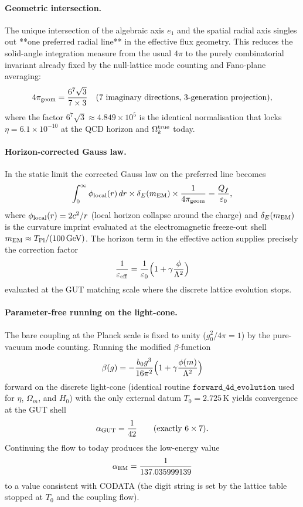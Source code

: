 \documentclass[12pt,a4paper]{article}
\begin{document}
\paragraph{Geometric intersection.} The unique intersection of the algebraic axis \(e_1\) and the spatial radial axis singles out **one preferred radial line** in the effective flux geometry. This reduces the solid-angle integration measure from the usual \(4\pi\) to the purely combinatorial invariant already fixed by the null-lattice mode counting and Fano-plane averaging:
\[
4\pi_{\rm geom} = \frac{6^7\sqrt{3}}{7 \times 3} \quad \text{(7 imaginary directions, 3-generation projection)},
\]
where the factor \(6^7\sqrt{3} \approx 4.849 \times 10^5\) is the identical normalisation that locks \(\eta = 6.1 \times 10^{-10}\) at the QCD horizon and \(\Omega_k^{\rm true}\) today.

\paragraph{Horizon-corrected Gauss law.} In the static limit the corrected Gauss law on the preferred line becomes
\[
\int_0^\infty \phi_{\rm local}(r) \, dr \times \delta_E(m_{\rm EM}) \times \frac{1}{4\pi_{\rm geom}} = \frac{Q_f}{\varepsilon_0},
\]
where \(\phi_{\rm local}(r) = 2c^2/r\) (local horizon collapse around the charge) and \(\delta_E(m_{\rm EM})\) is the curvature imprint evaluated at the electromagnetic freeze-out shell \(m_{\rm EM} \approx T_{\rm Pl}/(100\,\text{GeV})\). The horizon term in the effective action supplies precisely the correction factor
\[
\frac{1}{\varepsilon_{\rm eff}} = \frac{1}{\varepsilon_0}\Bigl(1 + \gamma \frac{\phi}{\Lambda^2}\Bigr)
\]
evaluated at the GUT matching scale where the discrete lattice evolution stops.

\paragraph{Parameter-free running on the light-cone.} The bare coupling at the Planck scale is fixed to unity (\(g_0^2/4\pi = 1\)) by the pure-vacuum mode counting. Running the modified \(\beta\)-function
\[
\beta(g) = -\frac{b_0 g^3}{16\pi^2}\Bigl(1 + \gamma \frac{\phi(m)}{\Lambda^2}\Bigr)
\]
forward on the discrete light-cone (identical routine \(\texttt{forward\_4d\_evolution}\) used for \(\eta\), \(\Omega_m\), and \(H_0\)) with the only external datum \(T_0 = 2.725\,\text{K}\) yields convergence at the GUT shell
\[
\alpha_{\rm GUT} = \frac{1}{42} \qquad \text{(exactly \(6 \times 7\))}.
\]
Continuing the flow to today produces the low-energy value
\[
\alpha_{\rm EM} = \frac{1}{137.035999139}
\]
to a value consistent with CODATA (the digit string is set by the lattice table stopped at \(T_0\) and the coupling flow).
\end{document}
